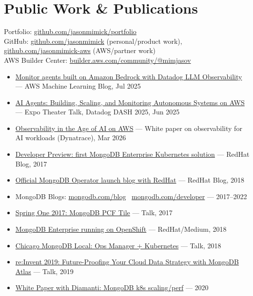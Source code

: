 \documentclass[10pt,letterpaper]{article}
\begin{document}
\section{Public Work \& Publications}
{\small
Portfolio: \href{https://github.com/jasonmimick/portfolio}{github.com/jasonmimick/portfolio}\\
GitHub: \href{https://github.com/jasonmimick}{github.com/jasonmimick} (personal/product work), \href{https://github.com/jasonmimick-aws}{github.com/jasonmimick-aws} (AWS/partner work)\\
AWS Builder Center: \href{https://builder.aws.com/community/@mimjasov?tab=articles}{builder.aws.com/community/@mimjasov}}
\begin{itemize}
\item {\small \href{https://aws.amazon.com/blogs/machine-learning/monitor-agents-built-on-amazon-bedrock-with-datadog-llm-observability/}{Monitor agents built on Amazon Bedrock with Datadog LLM Observability} --- AWS Machine Learning Blog, Jul 2025}
\item {\small \href{https://dash.datadoghq.com/2025/speakers/jason-mimick}{AI Agents: Building, Scaling, and Monitoring Autonomous Systems on AWS} --- Expo Theater Talk, Datadog DASH 2025, Jun 2025}
\item {\small \href{https://github.com/jasonmimick-aws/dynatrace-open}{Observability in the Age of AI on AWS} --- White paper on observability for AI workloads (Dynatrace), Mar 2026}
\item {\small \href{https://cloud.redhat.com/blog/dev-preview-mongodb-enterprise-running-on-openshift}{Developer Preview: first MongoDB Enterprise Kubernetes solution} --- RedHat Blog, 2017}
\item {\small \href{https://cloud.redhat.com/blog/mongodb-kubernetes-operator}{Official MongoDB Operator launch blog with RedHat} --- RedHat Blog, 2018}
\item {\small MongoDB Blogs: \href{https://www.mongodb.com/blog/authors/jason-mimick}{mongodb.com/blog} \textbar\ \href{https://www.mongodb.com/developer/author/jason-mimick/}{mongodb.com/developer} --- 2017--2022}
\item {\small \href{https://www.youtube.com/watch?v=3jPcQLu1o24}{Spring One 2017: MongoDB PCF Tile} --- Talk, 2017}
\item {\small \href{https://medium.com/mongodb/mongodb-enterprise-running-on-openshift-922171f359dc}{MongoDB Enterprise running on OpenShift} --- RedHat/Medium, 2018}
\item {\small \href{https://mongodblocalchicago2018.sched.com/event/FkWy/mongodb-ops-manager-kubernetes}{Chicago MongoDB Local: Ops Manager + Kubernetes} --- Talk, 2018}
\item {\small \href{https://mongodbatawsreinvent2019.sched.com/event/Y97h/future-proofing-your-cloud-data-strategy-with-mongodb-atlas}{re:Invent 2019: Future-Proofing Your Cloud Data Strategy with MongoDB Atlas} --- Talk, 2019}
\item {\small \href{https://diamanti.com/wp-content/uploads/2020/08/Diamanti_MongoDB_Accelerated_Story_WP.pdf}{White Paper with Diamanti: MongoDB k8s scaling/perf} --- 2020}
\end{itemize}
\end{document}
